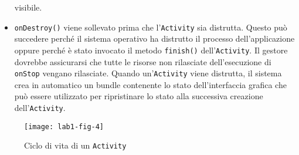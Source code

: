 \begin{itemize}
		visibile.
	\item \texttt{onDestroy()} viene sollevato prima che l'\texttt{Activity} sia
		distrutta. Questo può succedere perché il sistema operativo ha
		distrutto il processo dell'applicazione oppure perché è stato invocato
		il metodo \texttt{finish()} dell'\texttt{Activity}. Il gestore dovrebbe
		assicurarsi che tutte le risorse non rilasciate dell'esecuzione di
		\texttt{onStop} vengano rilasciate. Quando un'\texttt{Activity} viene
		distrutta, il sistema crea in automatico un bundle contenente lo stato
		dell'interfaccia grafica che può essere utilizzato per ripristinare lo
		stato alla successiva creazione dell'\texttt{Activity}.
\end{itemize}

\begin{figure}[htbp]
	\centering
	\texttt{[image: lab1-fig-4]}
	\caption{Ciclo di vita di un \texttt{Activity}}
\end{figure}
